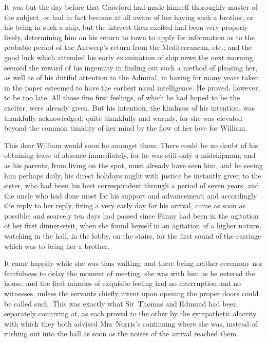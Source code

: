 It was but the day before that Crawford had made himself thoroughly master of the subject, or had in fact become at all aware of her having such a brother, or his being in such a ship, but the interest then excited had been very properly lively, determining him on his return to town to apply for information as to the probable period of the Antwerp's return from the Mediterranean, etc.; and the good luck which attended his early examination of ship news the next morning seemed the reward of his ingenuity in finding out such a method of pleasing her, as well as of his dutiful attention to the Admiral, in having for many years taken in the paper esteemed to have the earliest naval intelligence. He proved, however, to be too late. All those fine first feelings, of which he had hoped to be the exciter, were already given. But his intention, the kindness of his intention, was thankfully acknowledged: quite thankfully and warmly, for she was elevated beyond the common timidity of her mind by the flow of her love for William.

This dear William would soon be amongst them. There could be no doubt of his obtaining leave of absence immediately, for he was still only a midshipman; and as his parents, from living on the spot, must already have seen him, and be seeing him perhaps daily, his direct holidays might with justice be instantly given to the sister, who had been his best correspondent through a period of seven years, and the uncle who had done most for his support and advancement; and accordingly the reply to her reply, fixing a very early day for his arrival, came as soon as possible; and scarcely ten days had passed since Fanny had been in the agitation of her first dinner-visit, when she found herself in an agitation of a higher nature, watching in the hall, in the lobby, on the stairs, for the first sound of the carriage which was to bring her a brother.

It came happily while she was thus waiting; and there being neither ceremony nor fearfulness to delay the moment of meeting, she was with him as he entered the house, and the first minutes of exquisite feeling had no interruption and no witnesses, unless the servants chiefly intent upon opening the proper doors could be called such. This was exactly what Sir~Thomas and Edmund had been separately conniving at, as each proved to the other by the sympathetic alacrity with which they both advised Mrs~Norris's continuing where she was, instead of rushing out into the hall as soon as the noises of the arrival reached them.

